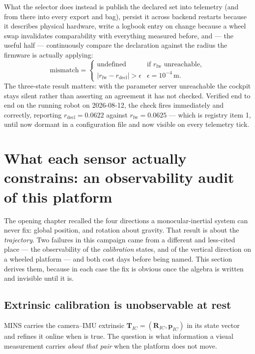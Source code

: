 What the selector does instead is publish the declared set into telemetry
(and from there into every export and bag), persist it across backend
restarts because it describes physical hardware, write a logbook entry on
change because a wheel swap invalidates comparability with everything
measured before, and --- the useful half --- continuously compare the
declaration against the radius the firmware is actually applying:
\begin{equation}
\text{mismatch} =
\begin{cases}
\text{undefined} & \text{if } r_{\mathrm{fw}} \text{ unreachable},\\[2pt]
\left| r_{\mathrm{fw}} - r_{\mathrm{decl}} \right| > \epsilon
  & \epsilon = 10^{-4}\,\text{m}.
\end{cases}
\label{eq:wheelmismatch}
\end{equation}
The three-state result matters: with the parameter server unreachable the
cockpit stays silent rather than asserting an agreement it has not checked.
Verified end to end on the running robot on 2026-08-12, the check fires
immediately and correctly, reporting
$r_{\mathrm{decl}} = 0.0622$ against $r_{\mathrm{fw}} = 0.0625$ --- which is
registry item 1, until now dormant in a configuration file and now visible
on every telemetry tick.

\section{What each sensor actually constrains: an observability audit of
this platform}
\label{sec:obsaudit}

The opening chapter recalled the four directions a monocular-inertial
system can never fix: global position, and rotation about gravity. That
result is about the \emph{trajectory}. Two failures in this campaign came
from a different and less-cited place --- the observability of the
\emph{calibration} states, and of the vertical direction on a wheeled
platform --- and both cost days before being named. This section derives
them, because in each case the fix is obvious once the algebra is written
and invisible until it is.

\subsection{Extrinsic calibration is unobservable at rest}
\label{sec:extunobs}

MINS carries the camera--IMU extrinsic $\mathbf{T}_{IC} = (\mathbf{R}_{IC},
\mathbf{p}_{IC})$ in its state vector and refines it online when
 is true. The question is what information a visual
measurement carries \emph{about that pair} when the platform does not move.


